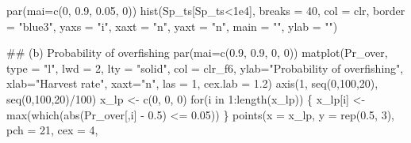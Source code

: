 \documentclass[
  11pt,
]{article}
\newenvironment{Shaded}{}{}
\newcommand{\AttributeTok}[1]{#1}
\newcommand{\ControlFlowTok}[1]{\textcolor[rgb]{0.00,0.00,1.00}{#1}}
\newcommand{\DecValTok}[1]{#1}
\newcommand{\DocumentationTok}[1]{\textcolor[rgb]{0.00,0.50,0.00}{#1}}
\newcommand{\FloatTok}[1]{#1}
\newcommand{\FunctionTok}[1]{#1}
\newcommand{\NormalTok}[1]{#1}
\newcommand{\OtherTok}[1]{\textcolor[rgb]{1.00,0.25,0.00}{#1}}
\newcommand{\SpecialCharTok}[1]{\textcolor[rgb]{0.00,0.50,0.50}{#1}}
\newcommand{\StringTok}[1]{\textcolor[rgb]{0.00,0.50,0.50}{#1}}
\begin{document}
\begin{Shaded}
\begin{Highlighting}[]
\FunctionTok{par}\NormalTok{(}\AttributeTok{mai=}\FunctionTok{c}\NormalTok{(}\DecValTok{0}\NormalTok{, }\FloatTok{0.9}\NormalTok{, }\FloatTok{0.05}\NormalTok{, }\DecValTok{0}\NormalTok{))}
\FunctionTok{hist}\NormalTok{(Sp\_ts[Sp\_ts}\SpecialCharTok{\textless{}}\FloatTok{1e4}\NormalTok{], }\AttributeTok{breaks =} \DecValTok{40}\NormalTok{,}
     \AttributeTok{col =}\NormalTok{ clr, }\AttributeTok{border =} \StringTok{"blue3"}\NormalTok{, }
     \AttributeTok{yaxs =} \StringTok{"i"}\NormalTok{, }\AttributeTok{xaxt =} \StringTok{"n"}\NormalTok{, }\AttributeTok{yaxt =} \StringTok{"n"}\NormalTok{,}
     \AttributeTok{main =} \StringTok{""}\NormalTok{, }\AttributeTok{ylab =} \StringTok{""}\NormalTok{)}

\DocumentationTok{\#\# (b) Probability of overfishing}
\FunctionTok{par}\NormalTok{(}\AttributeTok{mai=}\FunctionTok{c}\NormalTok{(}\FloatTok{0.9}\NormalTok{, }\FloatTok{0.9}\NormalTok{, }\DecValTok{0}\NormalTok{, }\DecValTok{0}\NormalTok{))}
\FunctionTok{matplot}\NormalTok{(Pr\_over, }\AttributeTok{type =} \StringTok{"l"}\NormalTok{, }\AttributeTok{lwd =} \DecValTok{2}\NormalTok{, }\AttributeTok{lty =} \StringTok{"solid"}\NormalTok{,}
        \AttributeTok{col =}\NormalTok{ clr\_f6, }
        \AttributeTok{ylab=}\StringTok{"Probability of overfishing"}\NormalTok{, }
        \AttributeTok{xlab=}\StringTok{"Harvest rate"}\NormalTok{, }\AttributeTok{xaxt=}\StringTok{"n"}\NormalTok{,}
        \AttributeTok{las =} \DecValTok{1}\NormalTok{, }\AttributeTok{cex.lab =} \FloatTok{1.2}\NormalTok{)}
\FunctionTok{axis}\NormalTok{(}\DecValTok{1}\NormalTok{, }\FunctionTok{seq}\NormalTok{(}\DecValTok{0}\NormalTok{,}\DecValTok{100}\NormalTok{,}\DecValTok{20}\NormalTok{), }\FunctionTok{seq}\NormalTok{(}\DecValTok{0}\NormalTok{,}\DecValTok{100}\NormalTok{,}\DecValTok{20}\NormalTok{)}\SpecialCharTok{/}\DecValTok{100}\NormalTok{)}
\NormalTok{x\_lp }\OtherTok{\textless{}{-}} \FunctionTok{c}\NormalTok{(}\DecValTok{0}\NormalTok{, }\DecValTok{0}\NormalTok{, }\DecValTok{0}\NormalTok{)}
\ControlFlowTok{for}\NormalTok{(i }\ControlFlowTok{in} \DecValTok{1}\SpecialCharTok{:}\FunctionTok{length}\NormalTok{(x\_lp)) \{}
\NormalTok{  x\_lp[i] }\OtherTok{\textless{}{-}} \FunctionTok{max}\NormalTok{(}\FunctionTok{which}\NormalTok{(}\FunctionTok{abs}\NormalTok{(Pr\_over[,i] }\SpecialCharTok{{-}} \FloatTok{0.5}\NormalTok{) }\SpecialCharTok{\textless{}=} \FloatTok{0.05}\NormalTok{))}
\NormalTok{\}}
\FunctionTok{points}\NormalTok{(}\AttributeTok{x =}\NormalTok{ x\_lp, }\AttributeTok{y =} \FunctionTok{rep}\NormalTok{(}\FloatTok{0.5}\NormalTok{, }\DecValTok{3}\NormalTok{), }\AttributeTok{pch =} \DecValTok{21}\NormalTok{, }\AttributeTok{cex =} \DecValTok{4}\NormalTok{,}

\end{Highlighting}
\end{Shaded}
\end{document}
